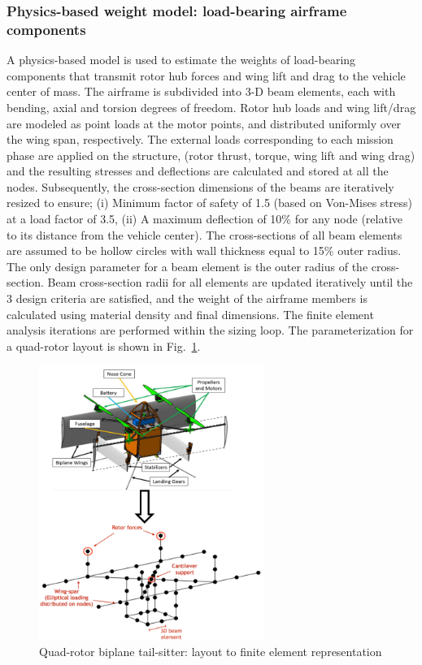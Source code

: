 \subsubsection{Physics-based weight model: load-bearing airframe components}
A physics-based model is used to estimate the weights of load-bearing components that transmit rotor hub forces and wing lift and drag to the vehicle center of mass. The airframe is subdivided into 3-D beam elements, each with bending, axial and torsion degrees of freedom. Rotor hub loads and wing lift/drag are modeled as point loads at the motor points, and distributed uniformly over the wing span, respectively. The external loads corresponding to each mission phase are applied on the structure,  (rotor thrust, torque, wing lift and wing drag) and the resulting stresses and deflections are calculated and stored at all the nodes. Subsequently, the cross-section dimensions of the beams are iteratively resized to ensure; (i) Minimum factor of safety of 1.5 (based on Von-Mises stress) at a load factor of 3.5, (ii) A maximum deflection of 10\% for any node (relative to its distance from the vehicle center). The cross-sections of all beam elements are assumed to be hollow circles with wall thickness equal to 15\% outer radius. The only design parameter for a beam element is the outer radius of the cross-section. Beam cross-section radii for all elements are updated iteratively until the 3 design criteria are satisfied, and the weight of the airframe members is calculated using material density and final dimensions. The finite element analysis iterations are performed within the sizing loop. The parameterization for a quad-rotor layout is shown in Fig.~\ref{fig:airframe}.

\begin{figure}
\begin{center}
\includegraphics[width=0.65\textwidth]{images/airframe.png}
\vspace{-0.1cm}
\caption{Quad-rotor biplane tail-sitter: layout to finite element representation}
\label{fig:airframe}
\end{center}
\end{figure}


